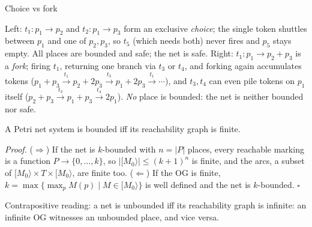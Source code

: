 \begin{examplebox}{Choice vs fork}
\begin{center}
\end{center}
Left: $t_1 : p_1 \to p_2$ and $t_2 : p_1 \to p_3$ form an exclusive \emph{choice}; the single token shuttles between $p_1$ and one of $p_2, p_3$, so $t_5$ (which needs both) never fires and $p_5$ stays empty. All places are bounded and safe; the net is safe. Right: $t_1 : p_1 \to p_2 + p_3$ is a \emph{fork}; firing $t_1$, returning one branch via $t_3$ or $t_4$, and forking again accumulates tokens ($p_1 + p_3 \xrightarrow{t_1} p_2 + 2p_3 \xrightarrow{t_3} p_1 + 2p_3 \xrightarrow{t_1} \cdots$), and $t_3, t_4$ can even pile tokens on $p_1$ itself ($p_2 + p_3 \xrightarrow{t_3} p_1 + p_3 \xrightarrow{t_4} 2p_1$). \emph{No} place is bounded: the net is neither bounded nor safe.
\end{examplebox}

\begin{theorem}
A Petri net system is bounded iff its reachability graph is finite.
\end{theorem}

\textit{Proof.} ($\Rightarrow$) If the net is $k$-bounded with $n = |P|$ places, every reachable marking is a function $P \to \{0, \ldots, k\}$, so $|[M_0\rangle| \leq (k+1)^n$ is finite, and the arcs, a subset of $[M_0\rangle \times T \times [M_0\rangle$, are finite too. ($\Leftarrow$) If the OG is finite, $k = \max\{\max_p M(p) \mid M \in [M_0\rangle\}$ is well defined and the net is $k$-bounded. \hfill$\square$

Contrapositive reading: a net is unbounded iff its reachability graph is infinite: an infinite OG witnesses an unbounded place, and vice versa.

